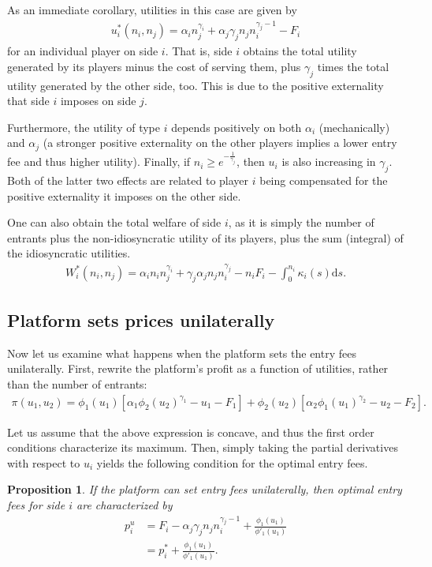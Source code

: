 \documentclass[a4paper]{article}
\newtheorem{proposition}{Proposition}
\newcommand{\ds}{\mathrm{d}s}
\begin{document}
As an immediate corollary, utilities in this case are given by
\begin{align*}
    u_i^*(n_i, n_j) = \alpha_i n_j ^ {\gamma_i} + \alpha_j \gamma_j n_j n_i^{\gamma_j - 1} - F_i
\end{align*}
for an individual player on side $i$.
That is, side $i$ obtains the total utility generated by its players minus the cost of serving them, plus $\gamma_j$ times the total utility generated by the other side, too. This is due to the positive externality that side $i$ imposes on side $j$.

Furthermore, the utility of type $i$ depends positively on both $\alpha_i$ (mechanically) and $\alpha_j$ (a stronger positive externality on the other players implies a lower entry fee and thus higher utility).
Finally, if $n_i \geq e^{-\frac{1}{\gamma_j}}$, then $u_i$ is also increasing in $\gamma_j$.
Both of the latter two effects are related to player $i$ being compensated for the positive externality it imposes on the other side.

One can also obtain the total welfare of side $i$, as it is simply the number of entrants plus the non-idiosyncratic utility of its players, plus the sum (integral) of the idiosyncratic utilities.
\begin{align}
    \label{eq:W_star}
    W_i^*(n_i, n_j) = \alpha_i n_i n_j ^ {\gamma_i} + \gamma_j \alpha_j n_j n_i^{\gamma_j} - n_i F_i - \int_0^{n_i} \kappa_i(s) \ds.
\end{align}

\subsection{Platform sets prices unilaterally}

Now let us examine what happens when the platform sets the entry fees unilaterally.
First, rewrite the platform's profit as a function of utilities, rather than the number of entrants:
\begin{align*}
    \pi(u_1, u_2) = \phi_1(u_1) [\alpha_1 \phi_2(u_2) ^ {\gamma_1} - u_1 - F_1] + \phi_2(u_2) [\alpha_2 \phi_1(u_1) ^ {\gamma_2} - u_2 - F_2].
\end{align*}

Let us assume that the above expression is concave, and thus the first order conditions characterize its maximum.
Then, simply taking the partial derivatives with respect to $u_i$ yields the following condition for the optimal entry fees.
\begin{proposition}
    \label{prop:platform_unilateral}
    If the platform can set entry fees unilaterally, then optimal entry fees for side $i$ are characterized by
    \begin{align*}
        p_i^u &= F_i - \alpha_j \gamma_j n_j n_i^{\gamma_j - 1} + \frac{\phi_1(u_1)}{\phi'_1(u_1)} \\
              &= p_i^* + \frac{\phi_1(u_1)}{\phi'_1(u_1)}.
    \end{align*}
\end{proposition}
\end{document}
